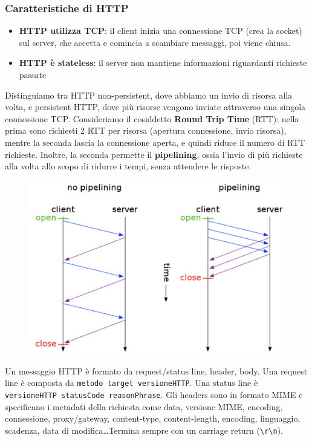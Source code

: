 \documentclass[11pt]{article}
\newcommand{\code}[1]{\texttt{#1}}
\begin{document}
\subsubsection{Caratteristiche di HTTP}
\begin{itemize}
    \item \textbf{HTTP utilizza TCP}: il client inizia una connessione TCP (crea la socket) sul server, che accetta e comincia a scambiare messaggi, poi viene chiusa.
    \item \textbf{HTTP è stateless}: il server non mantiene informazioni riguardanti richieste passate 
\end{itemize}
Distinguiamo tra HTTP non-persistent, dove abbiamo un invio di risorsa alla volta, e persistent HTTP, dove più risorse vengono inviate attraverso una singola connessione TCP. Consideriamo il cosiddetto \textbf{Round Trip Time} (RTT): nella prima sono richiesti 2 RTT per risorsa (apertura connessione, invio risorsa), mentre la seconda lascia la connessione aperta, e quindi riduce il numero di RTT richieste. Inoltre, la seconda permette il \textbf{pipelining}, ossia l'invio di più richieste alla volta allo scopo di ridurre i tempi, senza attendere le risposte.
\begin{figure}[H]
    \centering
    \includegraphics[width=0.6\linewidth]{res/pipelining.png}
\end{figure}
Un messaggio HTTP è formato da request/status line, header, body. Una request line è composta da \code{metodo target versioneHTTP}. Una status line è \code{versioneHTTP statusCode reasonPhrase}. Gli headers sono in formato MIME e specificano i metadati della richiesta come data, versione MIME, encoding, connessione, proxy/gateway, content-type, content-length, encoding, linguaggio, scadenza, data di modifica\dots Termina sempre con un carriage return (\code{\textbackslash r\textbackslash n}). 
\end{document}
